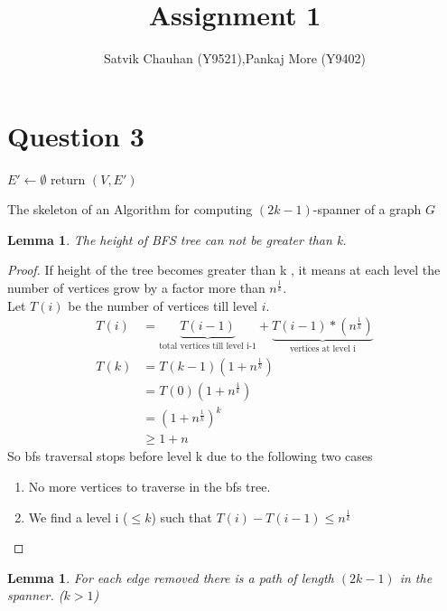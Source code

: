 \documentclass[11pt]{article}
\title{Assignment 1}
\author{Satvik Chauhan (Y9521),Pankaj More (Y9402)}
\newtheorem{lemma}[theorem]{Lemma}
\begin{document}
\maketitle

\section*{Question 3}
\begin{algorithm}[h]
$E'\leftarrow \emptyset$\;
return $(V,E')$\;
\caption{The skeleton of an Algorithm for computing $(2k-1)$-spanner of a graph $G$}
\label{skeleton}
\end{algorithm}
\begin{lemma}
The height of BFS tree can not be greater than  k.
\end{lemma}
\begin{proof}
If height of the tree becomes greater than k , it means at each level the number of vertices grow by a factor more than $n^{\frac{1}{k}}$. \\ 
Let $T(i)$ be the number of vertices till level $i$.
\begin{align*}
T(i) &= \underbrace{T(i-1)}_{\text{total vertices till level i-1}} + \underbrace{T(i-1)*(n^{\frac{1}{k}})}_{\text{vertices at level i}} \\
T(k) &= T(k-1) (1 + n^{\frac{1}{k}}) \\
	&= T(0) (1 + n^{\frac{1}{k}}) \\
	&= (1 + n^{\frac{1}{k}})^{k} \\
	&\geq 1 + n 
\end{align*}
So bfs traversal stops before level k due to the following two cases
\begin{enumerate}
\item No more vertices to traverse in the bfs tree. 
\item We find a level i ($\leq k$) such that $T(i) - T(i-1) \leq n^\frac{1}{k}$ 
\end{enumerate}
\end{proof}
\begin{lemma}
For each edge removed there is a path of length $(2k-1)$ in the spanner. ($k>1$)
\end{lemma}
\end{document}
